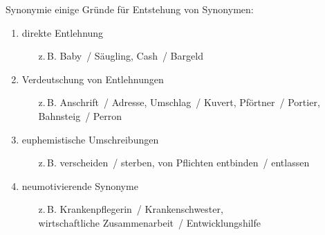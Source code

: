 \begin{frame}{Synonymie}
\onslide<+->
einige Gründe für Entstehung von Synonymen:
\Halbzeile
\begin{enumerate}[<+->]
	\item		direkte Entlehnung
	\begin{itemize}
		\item[z.\,B.]	Baby~/ Säugling, Cash~/ Bargeld
	\end{itemize}
        \Viertelzeile
	\item		Verdeutschung von Entlehnungen
	\begin{itemize}
		\item[z.\,B.]	Anschrift~/ Adresse, Umschlag~/ Kuvert, Pförtner~/ Portier,\\
                  Bahnsteig~/ Perron
	\end{itemize}
        \Viertelzeile
	\item		euphemistische Umschreibungen
	\begin{itemize}
		\item[z.\,B.]	verscheiden~/ sterben, von Pflichten entbinden~/ entlassen
	\end{itemize}
        \Viertelzeile
	\item		neumotivierende Synonyme
	\begin{itemize}
		\item[z.\,B.]	Krankenpflegerin~/ Krankenschwester,\\
                  wirtschaftliche Zusammenarbeit~/ Entwicklungshilfe
	\end{itemize}
\end{enumerate}
\end{frame}

